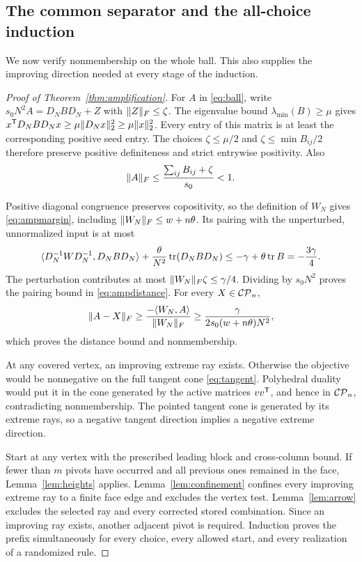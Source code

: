\subsection{The common separator and the all-choice induction}
We now verify nonmembership on the whole ball. This also supplies the improving direction needed at every stage of the induction.

\begin{proof}[Proof of Theorem~\ref{thm:amplification}]
For $A$ in \eqref{eq:ball}, write
$s_0N^2A=D_NBD_N+Z$ with $\lVert Z\rVert_F\le\zeta$.
The eigenvalue bound $\lambda_{\min}(B)\ge\mu$ gives
$x^{\mathsf T} D_NBD_Nx\ge\mu\lVert D_Nx\rVert_2^2\ge\mu\lVert x\rVert_2^2$.
Every entry of this matrix is at least the corresponding positive seed entry. The choices $\zeta\le\mu/2$ and $\zeta\le\min B_{ij}/2$ therefore preserve positive definiteness and strict entrywise positivity. Also
\[
 \lVert A\rVert_F\le\frac{\sum_{ij}B_{ij}+\zeta}{s_0}<1.
\]

Positive diagonal congruence preserves copositivity, so the definition of $W_N$ gives \eqref{eq:ampmargin}, including
$\lVert W_N\rVert_F\le w+n\theta$. Its pairing with the unperturbed, unnormalized input is at most
\[
 \langle D_N^{-1}WD_N^{-1},D_NBD_N\rangle
       +\frac{\theta}{N^2}\operatorname{tr}(D_NBD_N)
 \le-\gamma+\theta\operatorname{tr} B=-\frac{3\gamma}{4}.
\]
The perturbation contributes at most
$\lVert W_N\rVert_F\zeta\le\gamma/4$. Dividing by $s_0N^2$ proves the pairing bound in \eqref{eq:ampdistance}. For every $X\in\mathcal{CP}_n$,
\[
 \lVert A-X\rVert_F\ge
 \frac{-\langle W_N,A\rangle}{\lVert W_N\rVert_F}
 \ge\frac{\gamma}{2s_0(w+n\theta)N^2},
\]
which proves the distance bound and nonmembership.

At any covered vertex, an improving extreme ray exists. Otherwise the objective would be nonnegative on the full tangent cone \eqref{eq:tangent}. Polyhedral duality would put it in the cone generated by the active matrices $vv^{\mathsf T}$, and hence in $\mathcal{CP}_n$, contradicting nonmembership. The pointed tangent cone is generated by its extreme rays, so a negative tangent direction implies a negative extreme direction.

Start at any vertex with the prescribed leading block and cross-column bound. If fewer than $m$ pivots have occurred and all previous ones remained in the face, Lemma~\ref{lem:heights} applies. Lemma~\ref{lem:confinement} confines every improving extreme ray to a finite face edge and excludes the vertex test. Lemma~\ref{lem:arrow} excludes the selected ray and every corrected stored combination. Since an improving ray exists, another adjacent pivot is required. Induction proves the prefix simultaneously for every choice, every allowed start, and every realization of a randomized rule.


\end{proof}
